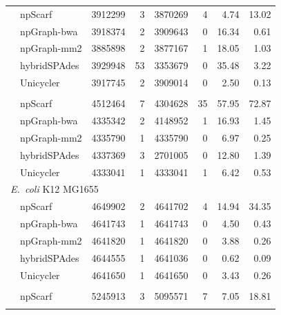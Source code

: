 \documentclass[10pt,twocolumn,twoside]{genpaper}
\newcommand{\ec}{\emph{E.~coli}}
\begin{document}
\begin{longtable}[!hpt]{llcrrrrr}
\nobreakmidrule
& npScarf & 3912299  &  3  &  3870269  &  4  & 4.74  & 13.02 \\*
& npGraph-bwa & 3918374  &  2  &  3909643  &  0 & 16.34  & 0.61 \\*
& npGraph-mm2 & 3885898  &  2  &  3877167  & 1 & 18.05  & 1.03 \\*
& hybridSPAdes &  3929948 &  53  &  3353679  &  0  & 35.48  & 3.22\\*
& Unicycler & 3917745  &  2 & 3909014  & 0  & 2.50  &  0.13\\
\hline
\rowcolor{Gray}
\multicolumn{8}{l}{\emph{Acinetobacter} AB30} \\* %
\nobreakmidrule
\rowcolor{Gray}
& npScarf & 4512464  &  7  &  4304628  &  35  & 57.95  & 72.87\\*
\rowcolor{Gray}
& npGraph-bwa & 4335342  &  2  &  4148952  &  1  & 16.93  & 1.45\\*
\rowcolor{Gray}
& npGraph-mm2 & 4335790  &  1  &  4335790  & 0   &  6.97 & 0.25\\*
\rowcolor{Gray}
& hybridSPAdes & 4337369  &  3  &  2701005  &  0  &  12.80 &  1.39\\*
\rowcolor{Gray}
& Unicycler &  4333041 &  1  &  4333041  &  1  &  6.42 &  0.53\\
\hline
\multicolumn{8}{l}{\ec{} K12 MG1655} \\* %
\nobreakmidrule
& npScarf & 4649902  &  2  &  4641702  &  4  & 14.94  & 34.35 \\*
& npGraph-bwa & 4641743  &  1  &  4641743  & 0  &  4.50 & 0.43 \\*
& npGraph-mm2 & 4641820  &  1  &  4641820  &  0 &  3.88 & 0.26 \\*
& hybridSPAdes &  4644555 &  1  &  4641036  &  0  & 0.62  & 0.09\\*
& Unicycler & 4641650  &  1 &  4641650 &  0 & 3.43  & 0.26 \\
\hline
\rowcolor{Gray}
\multicolumn{8}{l}{\ec{} O25b H4-ST131} \\* %
\nobreakmidrule
\rowcolor{Gray}
& npScarf &  5245913 &  3  &  5095571  &  7  &  7.05 & 18.81\\*
\rowcolor{Gray}

\end{longtable}
\end{document}
